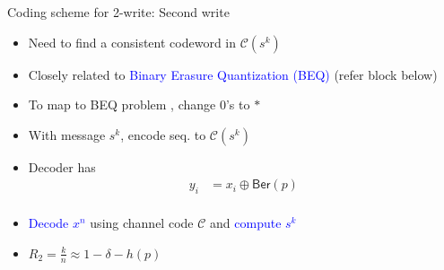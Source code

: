 \documentclass{beamer}
\newlength{\twocolwid}
\newlength{\itemspace}
\begin{document}
\begin{frame}
\begin{columns}[t]
\begin{column}{\twocolwid}
    \vspace{2cm}
\begin{block}{Coding scheme for 2-write: Second write}
    \begin{itemize}
	    \item Need to find a \alert{consistent} codeword in $\mathcal{C}(s^k)$
    \begin{center}
      \scalebox{1.5}{}
    \end{center}
   		 \item Closely related to \textcolor{blue}{Binary Erasure Quantization (BEQ)} ({\footnotesize refer block below})
   		 \item \vspace{\itemspace}To map to BEQ problem , change $0$'s to $*$
	     \item \vspace{\itemspace}With message $s^k$, encode seq. to $\mathcal{C}(s^k)$
        \item \vspace{\itemspace} Decoder has
        \begin{align*}
          y_i&=x_i \oplus \mathsf{Ber}(p) \\
        \end{align*}
    \vspace{-2.5cm}
    \item \textcolor{blue}{Decode $x^n$} using channel code $\mathcal{C}$ and \textcolor{blue}{compute $s^k$}
    \item\vspace{\itemspace} $R_2=\tfrac{k}{n}\approx 1 - \delta - h(p)$
	\end{itemize}
\end{block}


\end{column}
\end{columns}
\end{frame}
\end{document}
